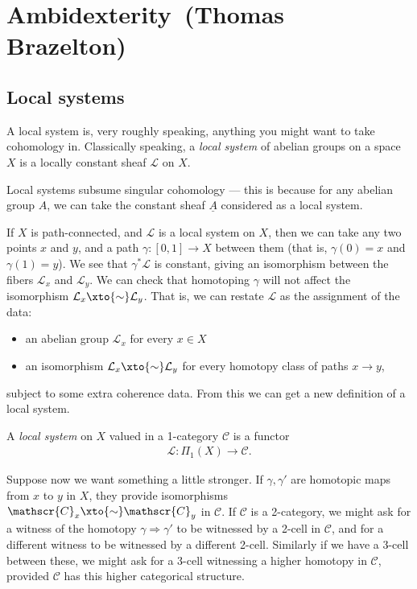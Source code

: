 \renewcommand{\thespeaker}{Thomas Brazelton}
\renewcommand{\thetitle}{Ambidexterity}
\section{\thetitle~(\thespeaker)}



\subsection{Local systems}
A local system is, very roughly speaking, anything you might want to take cohomology in. Classically speaking, a \textit{local system} of abelian groups on a space $X$ is a locally constant sheaf $\mathcal{L}$ on $X$. 

\begin{example} Local systems subsume singular cohomology --- this is because for any abelian group $A$, we can take the constant sheaf $\underline{A}$ considered as a local system.
\end{example}

If $X$ is path-connected, and $\mathcal{L}$ is a local system on $X$, then we can take any two points $x$ and $y$, and a path $\gamma: [0,1] \to X$ between them (that is, $\gamma(0) = x$ and $\gamma(1) = y$). We see that $\gamma^\ast \mathcal{L}$ is constant, giving an isomorphism between the fibers $\mathcal{L}_x$ and $\mathcal{L}_y$. We can check that homotoping $\gamma$ will not affect the isomorphism $\mathcal{L}_x \xto{\sim} \mathcal{L}_y$. That is, we can restate $\mathcal{L}$ as the assignment of the data:
\begin{itemize}
    \item an abelian group $\mathcal{L}_x$ for every $x\in X$
    \item an isomorphism $\mathcal{L}_x \xto{\sim} \mathcal{L}_y$ for every homotopy class of paths $x \to y$,
\end{itemize}
subject to some extra coherence data. From this we can get a new definition of a local system.

\begin{definition} A \textit{local system} on $X$ valued in a 1-category $\mathscr{C}$ is a functor
\begin{align*}
    \mathcal{L} : \Pi_1(X) \to \mathscr{C}.
\end{align*}
\end{definition}

Suppose now we want something a little stronger. If $\gamma,\gamma'$ are homotopic maps from $x$ to $y$ in $X$, they provide isomorphisms $\mathscr{C}_x \xto{\sim} \mathscr{C}_y$ in $\mathscr{C}$. If $\mathscr{C}$ is a 2-category, we might ask for a witness of the homotopy $\gamma \Rightarrow \gamma'$ to be witnessed by a 2-cell in $\mathscr{C}$, and for a different witness to be witnessed by a different 2-cell. Similarly if we have a 3-cell between these, we might ask for a 3-cell witnessing a higher homotopy in $\mathscr{C}$, provided $\mathscr{C}$ has this higher categorical structure.

